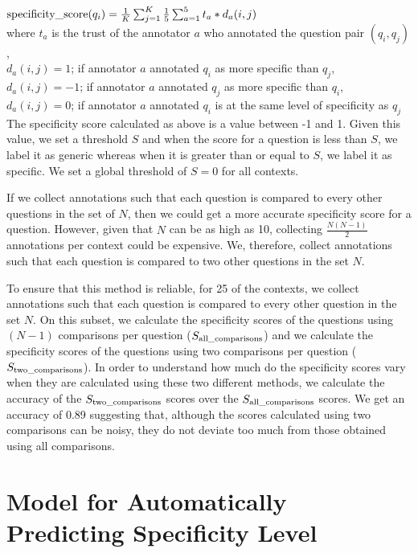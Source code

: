 \documentclass[11pt,a4paper]{article}
\begin{document}
$ \textnormal{specificity\_score}(q_i) = \frac{1}{K} \sum_{j=1}^K \frac{1}{5} \sum_{a=1}^5 t_a * d_a(i, j) $ \\

where $t_a$ is the trust of the annotator $a$ who annotated the question pair $(q_i, q_j)$, \\
$d_a(i, j) = 1$; if annotator $a$ annotated $q_i$ as more specific than $q_j$, \\
$d_a(i, j) = -1$; if annotator $a$ annotated $q_j$ as more specific than $q_i$, \\
$d_a(i, j) = 0$; if annotator $a$ annotated $q_i$ is at the same level of specificity as $q_j$ \\

The specificity score calculated as above is a value between -1 and 1. Given this value, we set a threshold $S$ and when the score for a question is less than $S$, we label it as generic whereas when it is greater than or equal to $S$, we label it as specific. We set a global threshold of $S = 0$ for all contexts. 

If we collect annotations such that each question is compared to every other questions in the set of $N$, then we could get a more accurate specificity score for a question. However, given that $N$ can be as high as 10, collecting $\frac{N(N-1)}{2}$ annotations per context could be expensive. We, therefore, collect annotations such that each question is compared to two other questions in the set $N$. 

To ensure that this method is reliable, for 25 of the contexts, we collect annotations such that each question is compared to every other question in the set $N$. On this subset, we calculate the specificity scores of the questions using $(N-1)$ comparisons per question ($S_{\textnormal{all\_comparisons}}$) and we calculate the specificity scores of the questions using two comparisons per question ($S_{\textnormal{two\_comparisons}}$). In order to understand how much do the specificity scores vary when they are calculated using these two different methods, we calculate the accuracy of the $S_{\textnormal{two\_comparisons}}$ scores over the $S_{\textnormal{all\_comparisons}}$ scores. We get an accuracy of 0.89 suggesting that, although the scores calculated using two comparisons can be noisy, they do not deviate too much from those obtained using all comparisons. 

\section{Model for Automatically Predicting Specificity Level}
\end{document}
